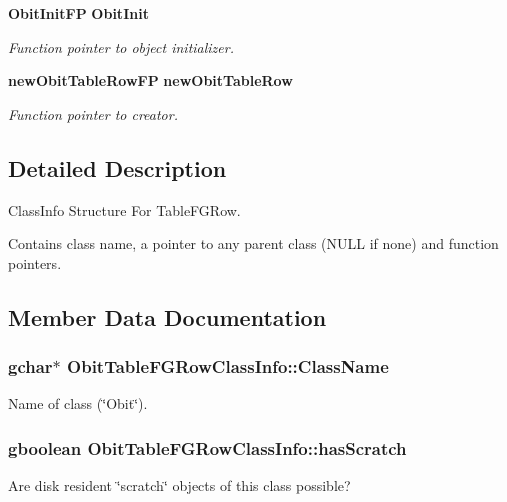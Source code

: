 \begin{CompactItemize}
{\bf Obit\-Init\-FP} {\bf Obit\-Init}
\begin{CompactList}\small\item\em Function pointer to object initializer. \item\end{CompactList}\item 
{\bf new\-Obit\-Table\-Row\-FP} {\bf new\-Obit\-Table\-Row}
\begin{CompactList}\small\item\em Function pointer to creator. \item\end{CompactList}\end{CompactItemize}


\subsection{Detailed Description}
Class\-Info Structure For Table\-FGRow. 

Contains class name, a pointer to any parent class (NULL if none) and function pointers. 



\subsection{Member Data Documentation}
\subsubsection{\setlength{\rightskip}{0pt plus 5cm}gchar$\ast$ {\bf Obit\-Table\-FGRow\-Class\-Info::Class\-Name}}\label{structObitTableFGRowClassInfo_o2}


Name of class (\char`\"{}Obit\char`\"{}). 

\subsubsection{\setlength{\rightskip}{0pt plus 5cm}gboolean {\bf Obit\-Table\-FGRow\-Class\-Info::has\-Scratch}}\label{structObitTableFGRowClassInfo_o1}


Are disk resident \char`\"{}scratch\char`\"{} objects of this class possible? 

